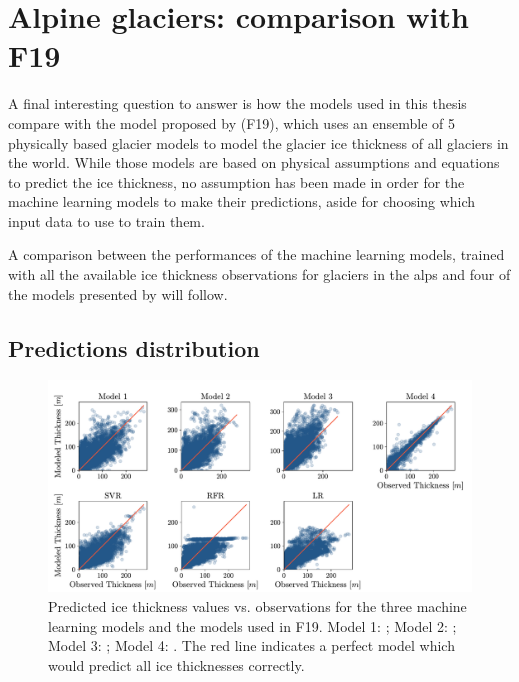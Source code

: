 \section{Alpine glaciers: comparison with F19}\label{disc-alps}

A final interesting question to answer is how the models used in this thesis compare with the model proposed by \citet{Farinotti2019} (F19), which uses an ensemble of 5 physically based glacier models to model the glacier ice thickness of all glaciers in the world. While those models are based on physical assumptions and equations to predict the ice thickness, no assumption has been made in order for the machine learning models to make their predictions, aside for choosing which input data to use to train them. 

A comparison between the performances of the machine learning models, trained with all the available ice thickness observations for glaciers in the alps and four of the models presented by \citet{Farinotti2019} will follow.

\subsection{Predictions distribution}\label{disc-distr} 

\begin{figure}[!tp]
	\centering		  
	\includegraphics[height=0.7\textwidth, angle=90, origin=c]{figures/physical_comp.pdf}
	\caption{Predicted ice thickness values vs. observations for the three machine learning models and the models used in F19. Model 1: \citet{Huss2012}; Model 2: \citet{Frey2014}; Model 3: \citet{OGGM2019}; Model 4: \citet{Furst2017}. The red line indicates a perfect model which would predict all ice thicknesses correctly.}
	\label{fig:thick-dist}
\end{figure}

